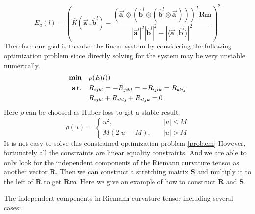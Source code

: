 \documentclass{article}
\begin{document}
\begin{equation}
	E_d(l)= \left(\widehat{K}(\widehat{\boldsymbol{a}}^l,\widehat{\boldsymbol{b}}^l)-\frac{(\widehat{\boldsymbol{a}}^l\otimes(\widehat{\boldsymbol{b}}^l\otimes(\widehat{\boldsymbol{b}}^l\otimes\widehat{\boldsymbol{a}}^l)))^T\boldsymbol{Rm}}{|\widehat{\boldsymbol{a}}^l|^2|\widehat{\boldsymbol{b}}^l|^2-|\langle \widehat{\boldsymbol{a}}^l,\widehat{\boldsymbol{b}}^l\rangle|^2}\right)^2
	\label{loss}
\end{equation}
Therefore our goal is to solve the linear system by considering the following optimization problem since directly solving for the system may be very unstable numerically.
\begin{align}
\notag
\textbf{min}\quad &\rho(E(l)) \\
\notag
\mathbf{s.t.}\quad &R_{ijkl}=-R_{jikl}=-R_{ijlk}=R_{klij} \\
& R_{ijkl}+R_{iklj}+R_{iljk} = 0
\label{problem}
\end{align}
Here $\rho$ can be choosed as Huber loss to get a stable result.
\begin{equation}
	\rho(u)=\begin{cases}u^2,&\quad |u|\leq M\\ M(2|u|-M),&\quad |u|>M \end{cases}
\end{equation}
It is not easy to solve this constrained optimization problem \ref{problem}
However, fortunately all the constraints are linear equality constraints. And we are able to only look for the independent components of the Riemann curvature tensor as another vector $\boldsymbol{R}$. Then we can construct a stretching matrix $\boldsymbol{S}$ and multiply it to the left of $\boldsymbol{R}$ to get $\boldsymbol{Rm}$. Here we give an example of how to construct $\boldsymbol{R}$ and $\boldsymbol{S}$.
\par
The independent components in Riemann curvature tensor including several cases:
\end{document}
